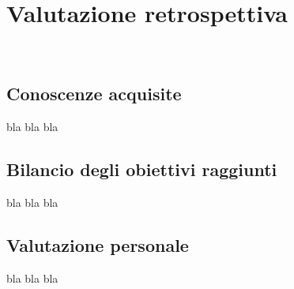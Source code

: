 
\chapter{Valutazione retrospettiva}
\label{cap:valutazione-retrospettiva}

\\

\section{Conoscenze acquisite}
bla bla bla
\section{Bilancio degli obiettivi raggiunti}
bla bla bla
\section{Valutazione personale}
bla bla bla